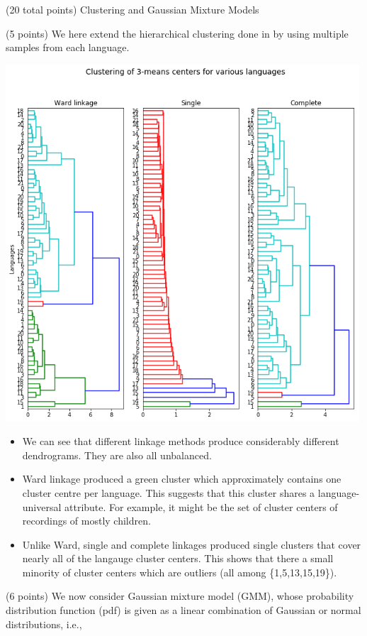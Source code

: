 \documentclass[12pt]{article}
\begin{document}
\begin{question}{(20 total points) Clustering and Gaussian Mixture Models}
\begin{subquestion}{(5 points)
       We here extend the hierarchical clustering done in  by
       using multiple samples from each language.
     }
   

      \begin{answerbox}{50em}
                  \begin{center}
	\includegraphics[width=0.99\textwidth]{imgs/3_4.png}
	\end{center}
	\begin{itemize}
	\itemsep -3pt {}
	\item We can see that different linkage methods produce considerably different dendrograms. They are also all unbalanced.
	\item Ward linkage produced a green cluster which approximately contains one cluster centre per language. This suggests that this cluster shares a language-universal attribute. For example, it might be the set of cluster centers of recordings of mostly children.
	\item Unlike Ward, single and complete linkages produced single clusters that cover nearly all of the langauge cluster centers. This shows that there a small minority of cluster centers which are outliers (all among \{1,5,13,15,19\}).
	\end{itemize}
      \end{answerbox}
  


   \end{subquestion}
   \begin{subquestion}{(6 points)
       We now consider Gaussian mixture model (GMM), whose
       probability distribution function (pdf) is given as
       a linear combination of Gaussian or normal distributions, i.e.,
     } \label{Q3.5}





\end{subquestion}
\end{question}
\end{document}
